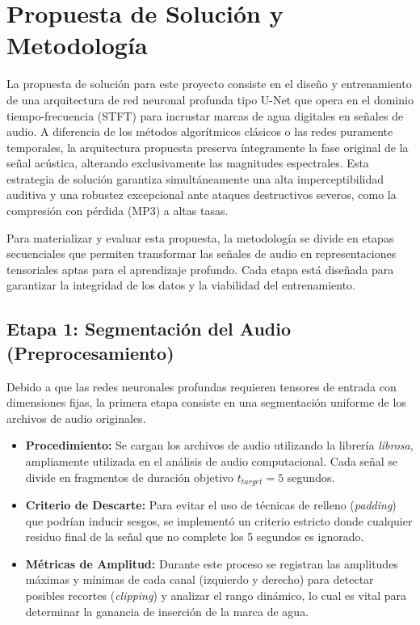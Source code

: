 \section{Propuesta de Solución y Metodología}
\label{ch:metodologia}

La propuesta de solución para este proyecto consiste en el diseño y entrenamiento de una arquitectura de red neuronal profunda tipo U-Net que opera en el dominio tiempo-frecuencia (STFT) para incrustar marcas de agua digitales en señales de audio. A diferencia de los métodos algorítmicos clásicos o las redes puramente temporales, la arquitectura propuesta preserva íntegramente la fase original de la señal acústica, alterando exclusivamente las magnitudes espectrales. Esta estrategia de solución garantiza simultáneamente una alta imperceptibilidad auditiva y una robustez excepcional ante ataques destructivos severos, como la compresión con pérdida (MP3) a altas tasas.

Para materializar y evaluar esta propuesta, la metodología se divide en etapas secuenciales que permiten transformar las señales de audio en representaciones tensoriales aptas para el aprendizaje profundo. Cada etapa está diseñada para garantizar la integridad de los datos y la viabilidad del entrenamiento.

\subsection{Etapa 1: Segmentación del Audio (Preprocesamiento)}
\label{sec:etapa1_segmentacion}

Debido a que las redes neuronales profundas requieren tensores de entrada con dimensiones fijas, la primera etapa consiste en una segmentación uniforme de los archivos de audio originales.

\begin{itemize}
    \item \textbf{Procedimiento:} Se cargan los archivos de audio utilizando la librería \textit{librosa}, ampliamente utilizada en el análisis de audio computacional. Cada señal se divide en fragmentos de duración objetivo $t_{target} = 5$ segundos.
    \item \textbf{Criterio de Descarte:} Para evitar el uso de técnicas de relleno (\textit{padding}) que podrían inducir sesgos, se implementó un criterio estricto donde cualquier residuo final de la señal que no complete los 5 segundos es ignorado.
    \item \textbf{Métricas de Amplitud:} Durante este proceso se registran las amplitudes máximas y mínimas de cada canal (izquierdo y derecho) para detectar posibles recortes (\textit{clipping}) y analizar el rango dinámico, lo cual es vital para determinar la ganancia de inserción de la marca de agua.
\end{itemize}

